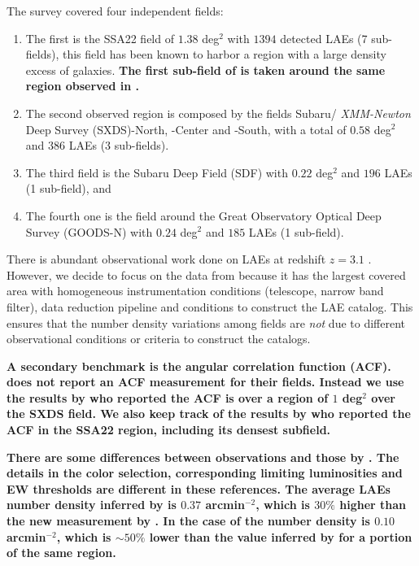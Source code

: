 \documentclass[usenatbib]{mn2e}
\begin{document}
The survey covered four independent fields:

\begin{enumerate}
\item The first is the SSA22
field of $1.38$ deg$^2$ with $1394$ detected LAEs (7 sub-fields), this
field has been known to harbor a region with a large density excess of
galaxies. {\bf The first sub-field of is taken around the same region
  observed in \cite{Hayashino2004}.}

\item The second observed region is composed by the fields Subaru/{\it
  XMM-Newton} Deep Survey (SXDS)-North, -Center and -South, with a
total of $0.58$ deg$^2$ and $386$ LAEs (3 sub-fields).

\item The third  field is the Subaru Deep Field (SDF) with $0.22$ deg$^2$ and
$196$ LAEs (1 sub-field), and 

\item The fourth one is the field around the Great Observatory
Optical Deep Survey  (GOODS-N) with $0.24$ deg$^2$ and $185$ LAEs (1
sub-field).  
\end{enumerate}
   

There is abundant observational work done on LAEs at redshift $z=3.1$
\citep{Kudritzki2000,Matsuda2005,Gawiser2007,Nilsson2007,Ouchi2008}.
However, we decide to focus on the data from \cite{Yamada2012} because
it has the largest covered area with homogeneous instrumentation
conditions (telescope, narrow band filter), data reduction pipeline
and conditions to construct the LAE catalog. This ensures that the
number density variations among fields are \emph{not} due to different
observational conditions or criteria to construct the catalogs.

{\bf A secondary benchmark is the angular correlation function
(ACF). \cite{Yamada2012} does not report an ACF measurement for
  their fields. Instead we use the results by   \cite{Ouchi2008} who
  reported the ACF is over a region of $1$ deg$^2$ over the SXDS
  field.  We also keep track of the results by \cite{Hayashino2004}
  who reported the ACF in the SSA22 region, including its densest
  subfield.}

{\bf There are some differences between \cite{Ouchi2008} observations
  and those by \cite{Yamada2012}. The details in the color selection,
  corresponding limiting luminosities and EW thresholds are different
  in these references. The average LAEs number density inferred by
  \cite{Hayashino2004} is  $0.37$ arcmin$^{-2}$, which is $30\%$
  higher than the new measurement by \cite{Yamada2012}. In the case of
  \cite{Ouchi2008} the number density is $0.10$ arcmin$^{-2}$, which
  is $\sim 50\%$ lower than the value inferred by \cite{Yamada2012}
  for a portion of the same region.} 
\end{document}

